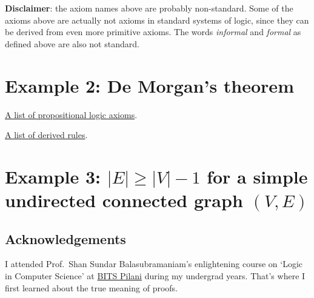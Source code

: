 \textbf{Disclaimer}: the axiom names above are probably non-standard.
Some of the axioms above are actually not axioms in standard systems of logic,
since they can be derived from even more primitive axioms.
The words \emph{informal} and \emph{formal} as defined above are also not standard.

\section{Example 2: De Morgan's theorem}


\begin{tightemize}
\item \href{https://en.wikipedia.org/wiki/Propositional_calculus#Example_2._Natural_deduction_system}%
{A list of propositional logic axioms}.
\item \href{https://en.wikipedia.org/wiki/Propositional_calculus#Basic_and_derived_argument_forms}%
{A list of derived rules}.
\end{tightemize}

\section{Example 3: \texorpdfstring{$|E| \ge |V|-1$}{|E| >= |V|-1}
for a simple undirected connected graph \texorpdfstring{$(V, E)$}{(V, E)}}




\subsection*{Acknowledgements}

I attended Prof.~Shan Sundar Balasubramaniam's enlightening course on
`Logic in Computer Science' at \href{https://www.bits-pilani.ac.in}{BITS Pilani}
during my undergrad years.
That's where I first learned about the true meaning of proofs.

%
%

